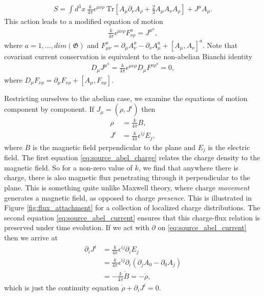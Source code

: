     \begin{align}
        S = \int d^3x \ \frac{k}{4 \pi} \epsilon^{\mu \nu \rho} \ \mathrm{Tr} \left[A_{\mu} \partial_{\nu} A_{\rho}+ \frac{2}{3} A_{\mu} A_{\nu} A_{\rho} \right] + J^{\mu} A_{\mu}.
    \end{align}
    This action leads to a modified equation of motion\colorbox{red}{ }
    \begin{align}
        \frac{k}{4 \pi} \epsilon^{\mu \nu \rho} F^a_{\nu \rho} = J^{\mu}^a,
    \end{align}
    where $a=1,...,dim(\mathfrak{G})$ and $F_{\mu \nu}^a = \partial_{\mu} A_{\nu}^a - \partial_{\nu} A_{\mu}^a + [A_{\mu}, A_{\nu}]^a$. Note that covariant current conservation is equivalent to the non-abelian Bianchi identity
    \begin{align}
        D_{\mu} J^{\mu}^a = \frac{k}{4 \pi} \epsilon^{\mu \nu \rho} D_{\mu} F^{\nu \rho}^a = 0,
    \end{align}
    where $D_{\mu} F_{\nu \rho} = \partial_{\mu} F_{\nu \rho} + [A_{\mu}, F_{\nu \rho}]$.

    Restricting ourselves to the abelian case, we examine the equations of motion component by component. If $J_{\mu} = (\rho, J^i)$ then
    \begin{align}
        \rho  &= \frac{k}{4 \pi} B \label{eq:source_abel_charge} ,\\
        J^i &= \frac{k}{4 \pi} \epsilon^{i j } E_j \label{eq:source_abel_current},
    \end{align}
    where $B$ is the magnetic field perpendicular to the plane and $E_j$ is the electric field. The first equation \eqref{eq:source_abel_charge} relates the charge density to the magnetic field. So for a non-zero value of $k$, we find that anywhere there is charge, there is also magnetic flux penetrating through it perpendicular to the plane. This is something quite unlike Maxwell theory, where charge \textit{movement} generates a magnetic field, as opposed to charge \textit{presence}. This is illustrated in  Figure \ref{fig:flux_attachment} for a collection of localized charge distributions. The second equation \eqref{eq:source_abel_current} ensures that this charge-flux relation is preserved under time evolution. If we act with $\partial$ on \eqref{eq:source_abel_current} then we arrive at
    \begin{align}
        \partial_i J^i &= \frac{k}{4 \pi} \epsilon^{ij} \partial_i E_j\nonumber \\
        &= \frac{k}{4 \pi} \epsilon^{ij} \partial_i ( \partial_j A_0 - \partial_0 A_j) \nonumber \\
        &= -\frac{k}{4 \pi} \dot{B} = -\dot{\rho},
    \end{align}
    which is just the continuity equation $\dot{\rho} + \partial_i J^i=0$.





